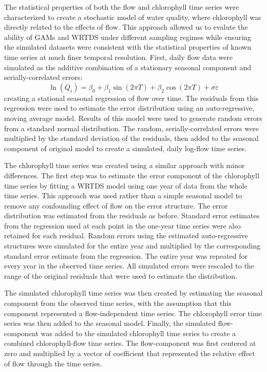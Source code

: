 \documentclass[letterpaper,12pt,oneside]{article}\usepackage[]{graphicx}\usepackage[]{color}
\begin{document}
The statistical properties of both the flow and chlorophyll time series were characterized to create a stochastic model of water quality, where chlorophyll was directly related to the effects of flow.  This approach allowed us to evalute the ability of \acp{GAM} and \ac{WRTDS} under different sampling regimes while ensuring the simulated datasets were consistent with the statistical properties of known time series at much finer temporal resolution.  First, daily flow data were simulated as the additive combination of a stationary seasonal component and serially-correlated errors:
\begin{equation}
\ln\left(Q_{i}\right) = \beta_0 + \beta_1 \sin\left(2\pi T\right) + \beta_2 \cos\left(2\pi T\right) + \sigma\dot\varepsilon
\end{equation}
creating a stational seasonal regression of flow over time.  The residuals from this regression were used to estimate the error distribution using an auto-regressive, moving average model.  Results of this model were used to generate random errors from a standard normal distribution.  The random, serially-correlated errors were multiplied by the standard deviation of the residuals, then added to the seasonal component of original model to create a simulated, daily log-flow time series.  

The chlorophyll time series was created using a similar approach with minor differences.  The first step was to estimate the error component of the chlorophyll time series by fitting a \ac{WRTDS} model using one year of data from the whole time series.  This approach was used rather than a simple seasonal model to remove any confounding effect of flow on the error structure.  The error distribution was estimated from the residuals as before.  Standard error estimates from the regression used at each point in the one-year time series were also retained for each residual.  Random errors using the estimated auto-regressive structures were simulated for the entire year and multiplied by the corresponding standard error estimate from the regression.  The entire year was repeated for every year in the observed time series.  All simulated errors were rescaled to the range of the original residuals that were used to estimate the distribution.  

The simulated chlorophyll time series was then created by estimating the seasonal component from the observed time series, with the assumption that this component represented a flow-independent time series.  The chlorophyll error time series was then added to the seasonal model.  Finally, the simulated flow-component was added to the simulated chlorophyll time series to create a combined chlorophyll-flow time series.  The flow-component was first centered at zero and multiplied by a vector of coefficient that represented the relative effect of flow through the time series.  
\end{document}
